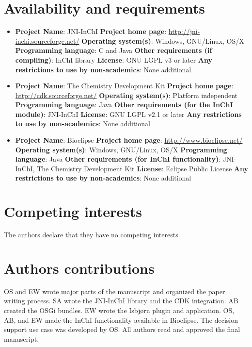 \documentclass[10pt]{bmc_article}
\newenvironment{bmcformat}{\fussy\setboolean{publ}{true}}{\fussy}
\begin{document}
\begin{bmcformat}
\section*{Availability and requirements}

\begin{itemize}
\item \textbf{Project Name}: JNI-InChI
\textbf{Project home page}: \url{http://jni-inchi.sourceforge.net/}
\textbf{Operating system(s)}: Windows, GNU/Linux, OS/X
\textbf{Programming language}: C and Java
\textbf{Other requirements (if compiling)}: InChI library
\textbf{License}: GNU LGPL v3 or later
\textbf{Any restrictions to use by non-academics}: None additional

\item \textbf{Project Name}: The Chemistry Development Kit
\textbf{Project home page}: \url{http://cdk.sourceforge.net/}
\textbf{Operating system(s)}: Platform independent
\textbf{Programming language}: Java
\textbf{Other requirements (for the InChI module)}: JNI-InChI
\textbf{License}: GNU LGPL v2.1 or later
\textbf{Any restrictions to use by non-academics}: None additional

\item \textbf{Project Name}: Bioclipse
\textbf{Project home page}: \url{http://www.bioclipse.net/}
\textbf{Operating system(s)}: Windows, GNU/Linux, OS/X
\textbf{Programming language}: Java
\textbf{Other requirements (for InChI functionality)}: JNI-InChI, The Chemistry Development Kit 
\textbf{License}: Eclipse Public License
\textbf{Any restrictions to use by non-academics}: None additional
\end{itemize}


\section*{Competing interests}
The authors declare that they have no competing interests.
    
\section*{Authors contributions}
OS and EW wrote major parts of the manuscript and organized the paper writing process. SA wrote the JNI-InChI library and
the CDK integration. AB created the OSGi bundles. EW wrote the Isbjørn plugin and application. OS, AB, and EW made the InChI
functionality available in Bioclipse. The decision support use case was developed by OS.
All authors read and approved the final manuscript.
    


\end{bmcformat}
\end{document}
